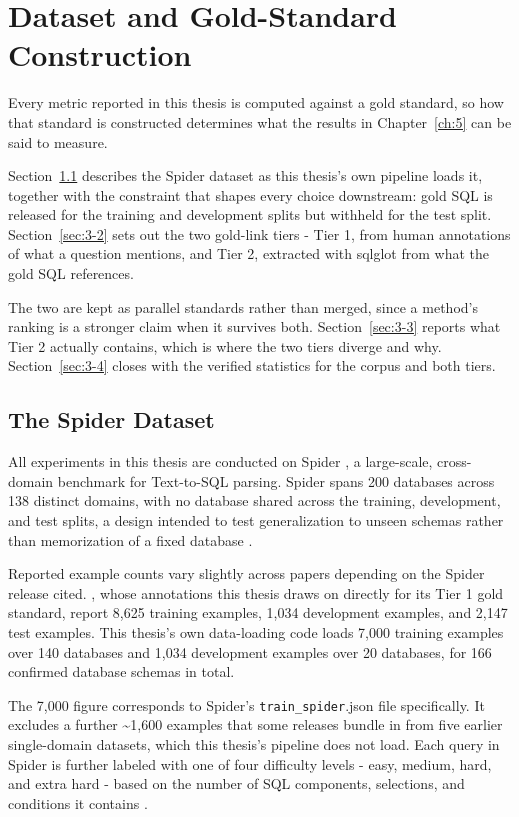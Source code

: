 \chapter{Dataset and Gold-Standard Construction}\label{ch:3}

Every metric reported in this thesis is computed against a gold standard, so how that standard is constructed determines what the results in Chapter~\ref{ch:5} can be said to measure.

Section~\ref{sec:3-1} describes the Spider dataset as this thesis's own pipeline loads it, together with the constraint that shapes every choice downstream: gold SQL is released for the training and development splits but withheld for the test split. Section~\ref{sec:3-2} sets out the two gold-link tiers - Tier 1, from \citet{taniguchi2021} human annotations of what a question mentions, and Tier 2, extracted with sqlglot from what the gold SQL references.

The two are kept as parallel standards rather than merged, since a method's ranking is a stronger claim when it survives both. Section~\ref{sec:3-3} reports what Tier 2 actually contains, which is where the two tiers diverge and why. Section~\ref{sec:3-4} closes with the verified statistics for the corpus and both tiers.

\section{The Spider Dataset}\label{sec:3-1}

All experiments in this thesis are conducted on Spider \citep{yu2018}, a large-scale, cross-domain benchmark for Text-to-SQL parsing. Spider spans 200 databases across 138 distinct domains, with no database shared across the training, development, and test splits, a design intended to test generalization to unseen schemas rather than memorization of a fixed database \citep{yu2018,qin2022}.

Reported example counts vary slightly across papers depending on the Spider release cited. \citet{taniguchi2021}, whose annotations this thesis draws on directly for its Tier 1 gold standard, report 8,625 training examples, 1,034 development examples, and 2,147 test examples. This thesis's own data-loading code loads 7,000 training examples over 140 databases and 1,034 development examples over 20 databases, for 166 confirmed database schemas in total.

The 7,000 figure corresponds to Spider's \texttt{train\_spider}.json file specifically. It excludes a further \textasciitilde1,600 examples that some releases bundle in from five earlier single-domain datasets, which this thesis's pipeline does not load. Each query in Spider is further labeled with one of four difficulty levels - easy, medium, hard, and extra hard - based on the number of SQL components, selections, and conditions it contains \citep{yu2018}.

